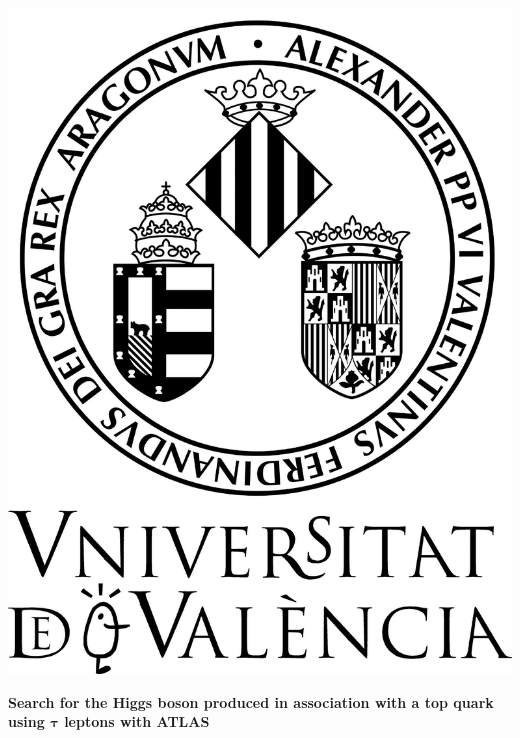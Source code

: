 

\setlength{\unitlength}{0.5cm} %
\thispagestyle{empty}
\begin{center}

\begin{center}
\includegraphics[scale=0.07]{Figures/0-Logos/Escudo03.jpg}
\end{center}

\vspace{1cm}

{\Large \bf{Search for the Higgs boson produced in association with a top quark using $\boldsymbol{\tau}$ leptons with ATLAS}} \\[2ex]




\end{center}
